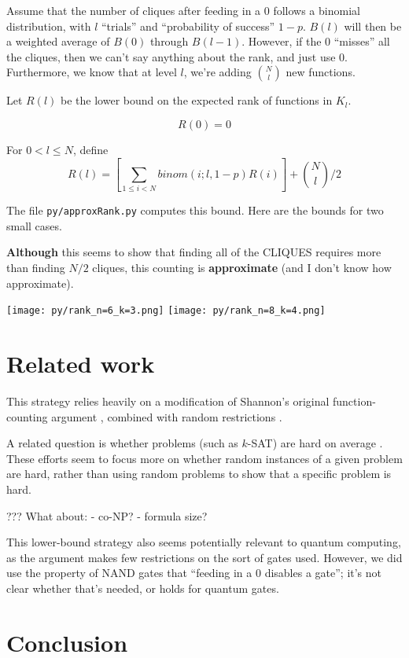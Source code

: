 \documentclass[12pt]{article}
\theoremstyle{definition}
\begin{document}
Assume that the number of cliques after feeding in a 0 follows a binomial
distribution, with $l$ ``trials'' and ``probability of success'' $1-p$.
$B(l)$ will then be a weighted average of $B(0)$ through $B(l-1)$. However,
if the 0 ``misses'' all the cliques, then we can't say anything about the
rank, and just use 0.
Furthermore, we know that at level $l$, we're adding ${N \choose l}$ new
functions.


Let $R(l)$ be the lower bound on the expected rank of functions in $K_l$.

\[
R(0) = 0
\]

For $0 < l \le N$, define
\[
	R(l) = [ \sum_{1\le i < N} binom(i; l, 1-p) R(i) ] + {N \choose l}/2
\]

The file {\tt py/approxRank.py} computes this bound. Here are the bounds
for two small cases.

{\bf Although} this seems to show that finding all of the CLIQUES requires
more than finding $N/2$ cliques, this counting is {\bf approximate} (and I don't
know how approximate).

\texttt{[image: py/rank\_n=6\_k=3.png]}
\texttt{[image: py/rank\_n=8\_k=4.png]}

\section{Related work}

This strategy relies heavily on a modification of Shannon's original
function-counting argument \cite{shannon_synthesis_1949},
combined with random restrictions
\cite{subbotovskaya1963comparison} \cite{hastad1987lower}.

A related question is whether problems
(such as $k$-SAT) are
hard on average \cite{bogdanov2006average}.
These efforts seem to focus more on whether
random
instances of a given problem are hard, rather
than using random problems to show that
a specific problem is hard.

??? What about:
- co-NP?
- formula size?


This lower-bound strategy also seems potentially
relevant to quantum computing,
as the argument makes few restrictions on the sort of gates used.
However, we did use the property of NAND gates that ``feeding in
a 0 disables a gate''; it's not clear whether that's needed,
or holds for quantum gates.

\section{Conclusion}
\end{document}
